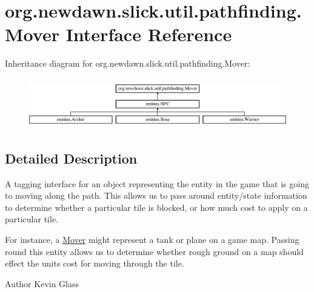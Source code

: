 \hypertarget{interfaceorg_1_1newdawn_1_1slick_1_1util_1_1pathfinding_1_1_mover}{}\section{org.\+newdawn.\+slick.\+util.\+pathfinding.\+Mover Interface Reference}
\label{interfaceorg_1_1newdawn_1_1slick_1_1util_1_1pathfinding_1_1_mover}
Inheritance diagram for org.\+newdawn.\+slick.\+util.\+pathfinding.\+Mover\+:\begin{figure}[H]
\begin{center}
\leavevmode
\includegraphics[height=2.222222cm]{interfaceorg_1_1newdawn_1_1slick_1_1util_1_1pathfinding_1_1_mover}
\end{center}
\end{figure}


\subsection{Detailed Description}
A tagging interface for an object representing the entity in the game that is going to moving along the path. This allows us to pass around entity/state information to determine whether a particular tile is blocked, or how much cost to apply on a particular tile.

For instance, a \mbox{\hyperlink{interfaceorg_1_1newdawn_1_1slick_1_1util_1_1pathfinding_1_1_mover}{Mover}} might represent a tank or plane on a game map. Passing round this entity allows us to determine whether rough ground on a map should effect the unit\textquotesingle{}s cost for moving through the tile.

\begin{DoxyAuthor}{Author}
Kevin Glass 
\end{DoxyAuthor}
